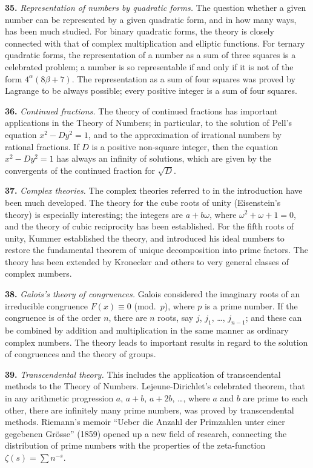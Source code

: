 \documentclass[11pt,a4paper]{book}
\begin{document}
\textbf{35.}\quad
\textit{Representation of numbers by quadratic forms.} The question whether a given number can be represented by a given quadratic form, and in how many ways, has been much studied. For binary quadratic forms, the theory is closely connected with that of complex multiplication and elliptic functions. For ternary quadratic forms, the representation of a number as a sum of three squares is a celebrated problem; a number is so representable if and only if it is not of the form $4^{\alpha}(8\beta + 7)$. The representation as a sum of four squares was proved by Lagrange to be always possible; every positive integer is a sum of four squares.

\textbf{36.}\quad
\textit{Continued fractions.} The theory of continued fractions has important applications in the Theory of Numbers; in particular, to the solution of Pell's equation $x^{2} - Dy^{2} = 1$, and to the approximation of irrational numbers by rational fractions. If $D$ is a positive non-square integer, then the equation $x^{2} - Dy^{2} = 1$ has always an infinity of solutions, which are given by the convergents of the continued fraction for $\sqrt{D}$.

\textbf{37.}\quad
\textit{Complex theories.} The complex theories referred to in the introduction have been much developed. The theory for the cube roots of unity (Eisenstein's theory) is especially interesting; the integers are $a + b\omega$, where $\omega^{2} + \omega + 1 = 0$, and the theory of cubic reciprocity has been established. For the fifth roots of unity, Kummer established the theory, and introduced his ideal numbers to restore the fundamental theorem of unique decomposition into prime factors. The theory has been extended by Kronecker and others to very general classes of complex numbers.

\textbf{38.}\quad
\textit{Galois's theory of congruences.} Galois considered the imaginary roots of an irreducible congruence $F(x) \equiv 0$ (mod.\ $p$), where $p$ is a prime number. If the congruence is of the order $n$, there are $n$ roots, say $j$, $j_{1}$, \ldots, $j_{n-1}$; and these can be combined by addition and multiplication in the same manner as ordinary complex numbers. The theory leads to important results in regard to the solution of congruences and the theory of groups.

\textbf{39.}\quad
\textit{Transcendental theory.} This includes the application of transcendental methods to the Theory of Numbers. Lejeune-Dirichlet's celebrated theorem, that in any arithmetic progression $a$, $a + b$, $a + 2b$, \ldots, where $a$ and $b$ are prime to each other, there are infinitely many prime numbers, was proved by transcendental methods. Riemann's memoir ``Ueber die Anzahl der Primzahlen unter einer gegebenen Gr\"osse'' (1859) opened up a new field of research, connecting the distribution of prime numbers with the properties of the zeta-function $\zeta(s) = \sum n^{-s}$.
\end{document}
